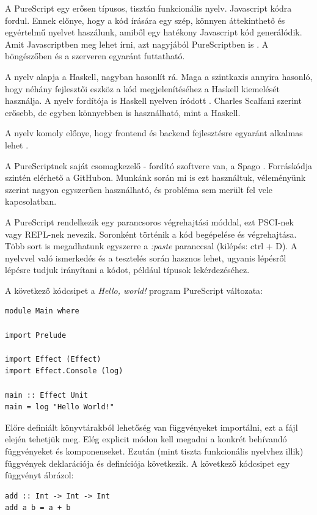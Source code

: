 \documentclass[12pt]{article}
\begin{document}
A PureScript egy erősen típusos, tisztán funkcionális nyelv. Javascript kódra fordul. Ennek előnye, hogy a kód írására egy szép, könnyen áttekinthető és egyértelmű nyelvet haszálunk, amiből egy hatékony Javascript kód generálódik. Amit Javascriptben meg lehet írni, azt nagyjából PureScriptben is \cite{CS}. A böngészőben és  a szerveren egyaránt futtatható.

A nyelv alapja a Haskell, nagyban hasonlít rá. Maga a szintkaxis annyira hasonló, hogy néhány fejlesztői eszköz a kód megjelenítéséhez a Haskell kiemelését használja. A nyelv fordítója is Haskell nyelven íródott \cite{CS}. Charles Scalfani \cite{CS} szerint erősebb, de egyben könnyebben is használható, mint a Haskell.

A nyelv komoly előnye, hogy frontend és backend fejlesztésre egyaránt alkalmas lehet \cite{CS}.

A PureScriptnek saját csomagkezelő - fordító szoftvere van, a Spago \cite{spago}. Forráskódja szintén elérhető a GitHubon. Munkánk során mi is ezt használtuk, véleményünk szerint nagyon egyszerűen használható, és probléma sem merült fel vele kapcsolatban.

A PureScript rendelkezik egy parancsoros végrehajtási móddal,  ezt PSCI-nek vagy REPL-nek nevezik.  Soronként történik a kód begépelése és végrehajtása. Több sort is megadhatunk egyszerre a \textit{:paste} paranccsal (kilépés: ctrl + D).  A nyelvvel való ismerkedés és a tesztelés során hasznos lehet,  ugyanis lépésről lépésre tudjuk irányítani a kódot,  például típusok lekérdezéséhez. 

A következő kódcsipet a  \textit{Hello,  world!} program PureScript változata:

\begin{verbatim}
module Main where

import Prelude

import Effect (Effect)
import Effect.Console (log)

main :: Effect Unit
main = log "Hello World!"
\end{verbatim}

Előre definiált könyvtárakból lehetőség van függvényeket importálni,  ezt a fájl elején tehetjük meg.  Elég explicit módon kell megadni a konkrét behívandó függvényeket és komponenseket.  Ezután (mint tiszta funkcionális nyelvhez illik) függvények deklarációja és definíciója következik.  A következő kódcsipet egy függvényt ábrázol:

\begin{verbatim}
add :: Int -> Int -> Int
add a b = a + b
\end{verbatim}
\end{document}
